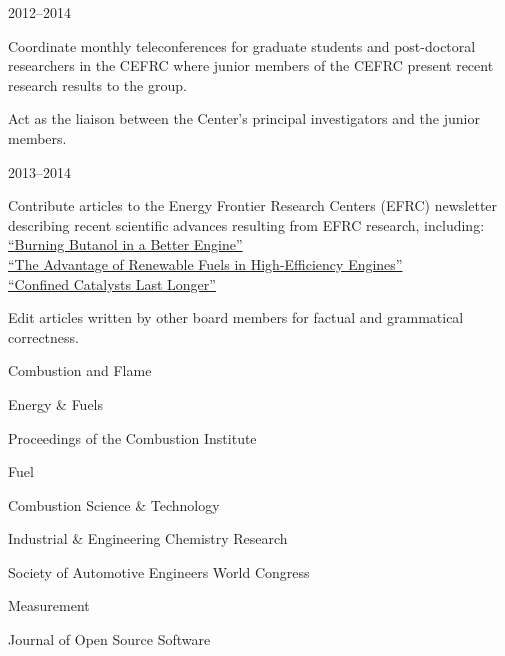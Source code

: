 \begin{lonelist}
    \item[]  \hfill 2012--2014\\

    \begin{innerlist}
        \item Coordinate monthly teleconferences for graduate students
        and post-doctoral researchers in the CEFRC where junior members of
        the CEFRC present recent research results to the group.
        \item Act as the liaison between the Center's principal investigators
        and the junior members.
    \end{innerlist}

    \item[]  \hfill 2013--2014\\

    \begin{innerlist}
        \item Contribute articles to the Energy Frontier Research Centers (EFRC)
        newsletter describing recent scientific advances resulting from
        EFRC research, including:\\
        \hspace*{0.25in}\href{http://www.energyfrontier.us/newsletter/201210/burning-butanol-better-engine}
        {``Burning Butanol in a Better Engine''}\\
        \hspace*{0.25in}\href{http://www.energyfrontier.us/newsletter/201401/advantage-renewable-fuels-high-efficiency-engines}
        {``The Advantage of Renewable Fuels in High-Efficiency Engines''}\\
        \hspace*{0.25in}\href{http://www.energyfrontier.us/newsletter/201404/confined-catalysts-last-longer}
        {``Confined Catalysts Last Longer''}
        \item Edit articles written by other board members for factual and grammatical correctness.
    \end{innerlist}

    \item[] 
    \begin{innerlist}
        \item Combustion and Flame
        \item Energy \& Fuels
        \item Proceedings of the Combustion Institute
        \item Fuel
        \item Combustion Science \& Technology
        \item Industrial \& Engineering Chemistry Research
        \item Society of Automotive Engineers World Congress
        \item Measurement
        \item Journal of Open Source Software
    \end{innerlist}


\end{lonelist}
